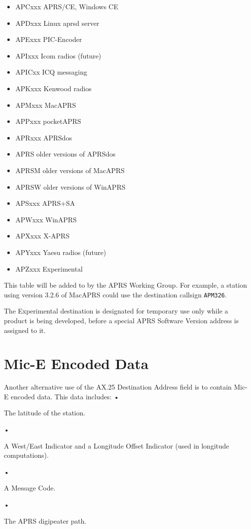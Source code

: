 \begin{itemize}

\item APCxxx APRS/CE, Windows CE
\item APDxxx Linux aprsd server
\item APExxx PIC-Encoder
\item APIxxx Icom radios (future)
\item APICxx ICQ messaging
\item APKxxx Kenwood radios
\item APMxxx MacAPRS
\item APPxxx pocketAPRS
\item APRxxx APRSdos
\item APRS older versions of APRSdos
\item APRSM older versions of MacAPRS
\item APRSW older versions of WinAPRS
\item APSxxx APRS+SA
\item APWxxx WinAPRS
\item APXxxx X-APRS
\item APYxxx Yaesu radios (future)
\item APZxxx Experimental

\end{itemize}

This table will be added to by the APRS Working Group.
For example, a station using version 3.2.6 of MacAPRS could use the
destination callsign \texttt{APM326}.

The Experimental destination is designated for temporary use only while a
product is being developed, before a special APRS Software Version address
is assigned to it.


\section {Mic-E Encoded Data}

Another alternative use of the AX.25 Destination Address field is to contain
Mic-E encoded data. This data includes:
•

The latitude of the station.

•

A West/East Indicator and a Longitude Offset Indicator (used in
longitude computations).

•

A Message Code.

•

The APRS digipeater path.

